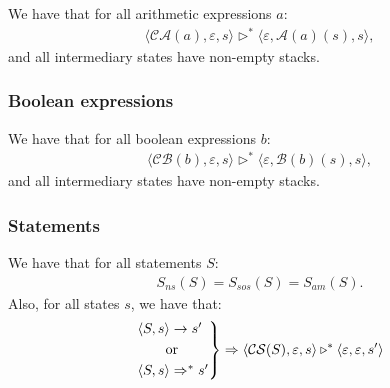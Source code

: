 \documentclass[a4paper, 12pt, twoside]{article}
\begin{document}
We have that for all arithmetic expressions $a$: \begin{gather*}
  \langle \mathcal{CA}(a), \varepsilon, s \rangle 
  \triangleright^*
  \langle \varepsilon, \mathcal{A}(a)(s), s \rangle,
\end{gather*} and all intermediary states have non-empty stacks.

\subsubsection{Boolean expressions}

We have that for all boolean expressions $b$: \begin{gather*}
  \langle \mathcal{CB}(b), \varepsilon, s \rangle 
  \triangleright^*
  \langle \varepsilon, \mathcal{B}(b)(s), s \rangle,
\end{gather*} and all intermediary states have non-empty stacks.

\subsubsection{Statements}

We have that for all statements $S$: \begin{gather*}
  S_{ns}(S) = S_{sos}(S) = S_{am}(S).
\end{gather*} Also, for all states $s$, we have that: \begin{gather*}
  \begin{rcases*}
    \langle S, s \rangle \to s' \\
    \qquad \text{or} \\
    \langle S, s \rangle \Rightarrow^* s'
  \end{rcases*} \Rightarrow
  \langle \mathcal{CS}(S), \varepsilon, s \rangle \triangleright^* 
  \langle \varepsilon, \varepsilon, s' \rangle 
\end{gather*}
\end{document}
